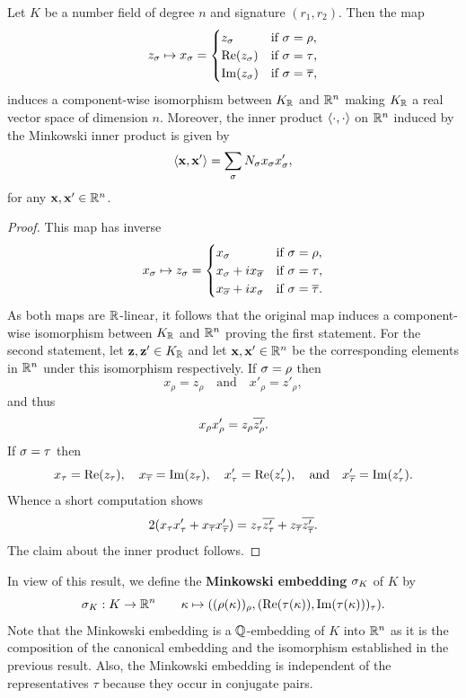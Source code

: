     \begin{proposition}\label{prop:Minkowski_space_isomorphism}
      Let \(K\) be a number field of degree \(n\) and signature \((r_{1},r_{2})\). Then the map
      \[
        z_{\sigma} \mapsto x_{\sigma} = \begin{cases} z_{\sigma} & \text{if \(\sigma= \rho\)}, \\ \mathrm{Re}(z_{\sigma}) & \text{if \(\sigma= \tau\)}, \\ \mathrm{Im}(z_{\sigma}) & \text{if \(\sigma= \overline{\tau}\)}, \end{cases}
      \]
      induces a component-wise isomorphism between \(K_{\mathbb{R}}\) and \(\mathbb{R}^{n}\) making \(K_{\mathbb{R}}\) a real vector space of dimension \(n\). Moreover, the inner product \(\langle\cdot,\cdot\rangle\) on \(\mathbb{R}^{n}\) induced by the Minkowski inner product is given by
      \[
        \langle\mathbf{x},\mathbf{x}'\rangle = \sum_{\sigma}N_{\sigma}x_{\sigma}x'_{\sigma},
      \]
      for any \(\mathbf{x},\mathbf{x}' \in \mathbb{R}^{n}\).
    \end{proposition}
    \begin{proof}
      This map has inverse
      \[
        x_{\sigma} \mapsto z_{\sigma} = \begin{cases} x_{\sigma} & \text{if \(\sigma= \rho\)}, \\ x_{\sigma}+ix_{\overline{\sigma}} & \text{if \(\sigma= \tau\)}, \\ x_{\overline{\sigma}}+ix_{\sigma} & \text{if \(\sigma= \overline{\tau}\)}. \end{cases}
      \]
      As both maps are \(\mathbb{R}\)-linear, it follows that the original map induces a component-wise isomorphism between \(K_{\mathbb{R}}\) and \(\mathbb{R}^{n}\) proving the first statement. For the second statement, let \(\mathbf{z},\mathbf{z}' \in K_{\mathbb{R}}\) and let \(\mathbf{x},\mathbf{x}' \in \mathbb{R}^{n}\) be the corresponding elements in \(\mathbb{R}^{n}\) under this isomorphism respectively. If \(\sigma = \rho\) then
      \[
        x_{\rho} = z_{\rho} \quad \text{and} \quad x'_{\rho} = z'_{\rho},
      \]
      and thus
      \[
        x_{\rho}x'_{\rho} = z_{\rho}\overline{z'_{\rho}}.
      \]
      If \(\sigma = \tau\) then
      \[
        x_{\tau} = \mathrm{Re}(z_{\tau}), \quad x_{\overline{\tau}} = \mathrm{Im}(z_{\tau}), \quad x'_{\tau} = \mathrm{Re}(z'_{\tau}), \quad \text{and} \quad x'_{\overline{\tau}} = \mathrm{Im}(z'_{\tau}).
      \]
      Whence a short computation shows
      \[
        2(x_{\tau}x'_{\tau}+x_{\overline{\tau}}x'_{\overline{\tau}}) = z_{\tau}\overline{z'_{\tau}}+z_{\overline{\tau}}\overline{z'_{\overline{\tau}}}.
      \]
      The claim about the inner product follows.
    \end{proof}

    In view of this result, we define the \textbf{Minkowski embedding} \(\sigma_{K}\) of \(K\) by
    \[
      \sigma_{K}:K \to \mathbb{R}^{n} \qquad \kappa \mapsto ((\rho(\kappa))_{\rho},(\mathrm{Re}(\tau(\kappa)),\mathrm{Im}(\tau(\kappa)))_{\tau}).
    \]
    Note that the Minkowski embedding is a \(\mathbb{Q}\)-embedding of \(K\) into \(\mathbb{R}^{n}\) as it is the composition of the canonical embedding and the isomorphism established in the previous result. Also, the Minkowski embedding is independent of the representatives \(\tau\) because they occur in conjugate pairs.
    
